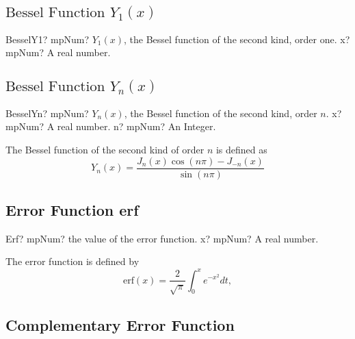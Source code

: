 \subsection{\texorpdfstring{$\text{Bessel Function }Y_1(x)$}{Y1x}}

\begin{mpFunctionsExtract}
	\mpFunctionOne
	{BesselY1? mpNum? $Y_1(x)$, the Bessel function of the second kind, order one.}
	{x? mpNum? A real number.}
\end{mpFunctionsExtract}



\subsection{\texorpdfstring{$\text{Bessel Function }Y_n(x)$}{Ynx}}

\begin{mpFunctionsExtract}
	\mpFunctionTwo
	{BesselYn? mpNum? $Y_n(x)$, the Bessel function of the second kind, order $n$.}
	{x? mpNum? A real number.}
	{n? mpNum? An Integer.}
\end{mpFunctionsExtract}



\vspace{0.3cm}
The Bessel function of the second kind of order $n$ is defined as
\begin{equation}
	Y_{n}(x)  = \frac{J_{n}(x) \cos(n \pi) - J_{-n}(x)}{ \sin(n \pi)}
\end{equation}







\subsection{Error Function erf}
\label{Error Function erf}

\begin{mpFunctionsExtract}
	\mpFunctionOne
	{Erf? mpNum? the value of the error function.}
	{x? mpNum? A real number.}
\end{mpFunctionsExtract}


\vspace{0.3cm}
The error function is defined by
\begin{equation}
	\text{erf}(x) = \frac{2}{\sqrt{\pi}} \int_0^x e^{-x^2} dt,
\end{equation}



\subsection{Complementary Error Function}
\label{Complementary Error Function}

